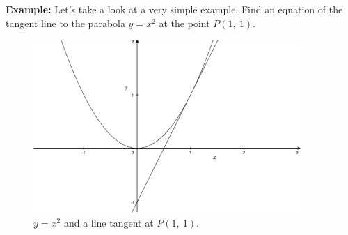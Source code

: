 \documentclass[12pt,addpoints, answers, fleqn]{exam}
\begin{document}
\textbf{Example:} Let's take a look at a very simple example. Find an equation of the tangent line to the parabola $y = x^2$ at the point $P\left( 1, \ 1 \right)$.


\begin{figure}[htbp] %
   \centering
   \includegraphics[width=4in]{graphics/graph020101.pdf} 
   \caption{$y=x^2$ and a line tangent at $P\left( 1, \ 1 \right)$.}
   \label{fig:graph020101}
\end{figure}
\end{document}
